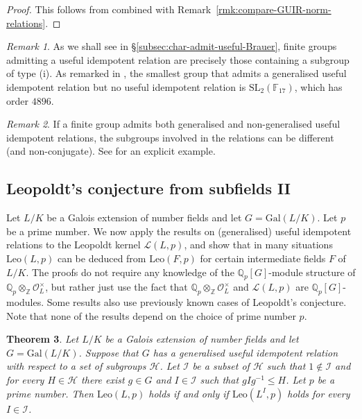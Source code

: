 \documentclass[12pt]{amsart}
\theoremstyle{plain}
\newtheorem{theorem}{Theorem}[section]
\theoremstyle{remark}
\newtheorem{remark}[theorem]{Remark}
\theoremstyle{definition}
\newcommand{\Z}{\mathbb{Z}}
\newcommand{\Q}{\mathbb{Q}}
\newcommand{\F}{\mathbb{F}}
\newcommand{\Gal}{\mathrm{Gal}}
\newcommand{\Leo}{\mathrm{Leo}}
\numberwithin{equation}{section}
\begin{document}
\begin{proof}
This follows from \cite[Theorem~2.11]{MR4440537} combined with Remark~\ref{rmk:compare-GUIR-norm-relations}.
\end{proof}

\begin{remark}\label{rmk:existence-guir}
As we shall see in \S \ref{subsec:char-admit-useful-Brauer},
finite groups admitting a useful 
idempotent relation are precisely those containing a subgroup of type (i). 
As remarked in \cite[Example~2.12]{MR4440537},  
the smallest group that admits a generalised useful idempotent relation
but no useful idempotent relation is
$\mathrm{SL}_{2}(\F_{17})$, which has order $4896$.
\end{remark}

\begin{remark}\label{rmk:different-subgroups-uir-guir}
If a finite group admits both generalised and non-generalised useful idempotent relations, 
the subgroups involved in the relations can be different (and non-conjugate). 
See \cite[Example~2.13]{MR4440537} for an explicit example.
\end{remark}


\subsection{Leopoldt's conjecture from subfields II}\label{subsec:Leo-from-subfields-II}
Let $L/K$ be a Galois extension of number fields and let $G=\Gal(L/K)$.
Let $p$ be a prime number.
We now apply the results on (generalised) useful idempotent relations to the Leopoldt kernel 
$\mathcal{L}(L,p)$, and show that in many situations $\Leo(L,p)$ can be deduced
from $\Leo(F,p)$ for certain intermediate fields $F$ of $L/K$. 
The proofs do not require any knowledge of the 
$\Q_{p}[G]$-module structure of $\Q_{p} \otimes_{\Z} \mathcal{O}_{L}^{\times}$, 
but rather just use the fact that $\Q_{p} \otimes_{\Z} \mathcal{O}_{L}^{\times}$ and 
$\mathcal{L}(L,p)$ are $\Q_{p}[G]$-modules. 
Some results also use previously known cases of Leopoldt's conjecture. 
Note that none of the results depend on the choice of prime number $p$.


\begin{theorem}\label{thm:norm-rels-Leopoldt}
Let $L/K$ be a Galois extension of number fields and let $G=\Gal(L/K)$. 
Suppose that $G$ has a generalised useful idempotent relation with respect to a set of subgroups 
$\mathcal{H}$.
Let $\mathcal{I}$ be a subset of $\mathcal{H}$ such that $1 \notin \mathcal{I}$ and
for every $H \in \mathcal{H}$ there exist $g \in G$ and 
$I \in \mathcal{I}$ such that $gIg^{-1} \leq H$. 
Let $p$ be a prime number.
Then $\Leo(L,p)$ holds if and only if $\Leo(L^{I},p)$ holds for every $I \in \mathcal{I}$.
\end{theorem}
\end{document}
